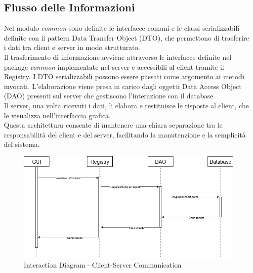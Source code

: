 \subsection{Flusso delle Informazioni}
Nel modulo \textit{common} sono definite le interfacce comuni e le 
classi serializzabili definite con il pattern 
Data Transfer Object (DTO), che permettono di trasferire
i dati tra client e server in modo strutturato.\\
Il trasferimento di informazione avviene attraverso le interfacce 
definite nel package \textit{common} implementate nel server e 
accessibili al client tramite il Registry.
I DTO serializzabili possono essere passati come argomento ai 
metodi invocati.
L'elaborazione viene presa 
in carico dagli oggetti Data Access Object (DAO) 
presenti sul server che
gestiscono l'interazione con il database.\\
Il server, una volta ricevuti i dati, li elabora e restituisce
le risposte al client, che le visualizza nell'interfaccia grafica.\\
Questa architettura consente di mantenere una chiara separazione
tra le responsabilità del client e del server, facilitando la
manutenzione e la semplicità del sistema.
\begin{figure}[H]
  \centering
  \includegraphics[width=\textwidth]{images/UML-interaction.png}
  \caption{Interaction Diagram - Client-Server Communication}
  \label{fig:interaction-diagram}
\end{figure}
